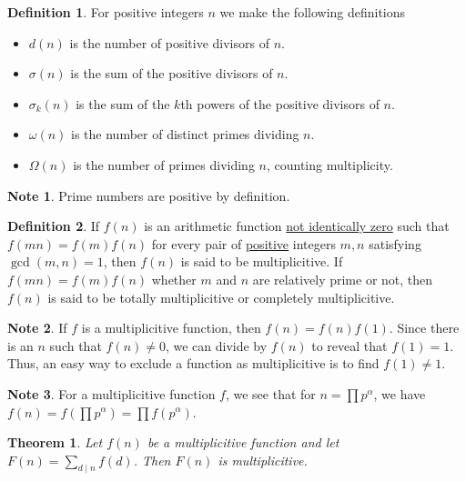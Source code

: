 \documentclass{amsart}
\newtheorem{theorem}{Theorem}
\theoremstyle{definition}
\newtheorem*{definition*}{Definition}
\newtheorem*{note*}{Note}
\begin{document}
\begin{definition*}
  For positive integers $n$ we make the following definitions
  \begin{itemize}
  \item[] $d(n)$ is the number of positive divisors of $n$.
  \item[] $\sigma(n)$ is the sum of the positive divisors of $n$.
  \item[] $\sigma_k(n)$ is the sum of the $k$th powers of the 
    positive divisors of $n$.
  \item[] $\omega(n)$ is the number of distinct primes dividing $n$.
  \item[] $\Omega(n)$ is the number of primes dividing $n$, counting
    multiplicity.
  \end{itemize}
\end{definition*}

\begin{note*}
  Prime numbers are positive by definition.  
\end{note*}

\begin{definition*}
  If $f(n)$ is an arithmetic function \underline{not identically zero} such
  that $f(mn) = f(m)f(n)$ for every pair of 
  \underline{positive} integers $m,n$
  satisfying $\gcd(m,n) = 1$, then $f(n)$ is said to be multiplicitive.
  If $f(mn) = f(m)f(n)$ whether $m$ and $n$ are relatively prime or not,
  then $f(n)$ is said to be totally multiplicitive or completely 
  multiplicitive. 
\end{definition*}

\begin{note*}
  If $f$ is a multiplicitive function, then $f(n) = f(n)f(1)$.
  Since there is an $n$ such that $f(n) \neq 0$, we can divide
  by $f(n)$ to reveal that $f(1) = 1$.
  Thus, an easy way to exclude a function as multiplicitive is to 
  find $f(1) \neq 1$.
\end{note*}

\begin{note*}
  For a multiplicitive function $f$, we see that for 
  $n = \prod p^{\alpha}$, we have
  $f(n) = f\left( \prod p^{\alpha} \right) = \prod f(p^{\alpha})$.
\end{note*}

\begin{theorem}
  Let $f(n)$ be a multiplicitive function and let 
  $F(n) = \sum_{d \mid n} f(d)$.
  Then $F(n)$ is multiplicitive.
\end{theorem}
\end{document}
